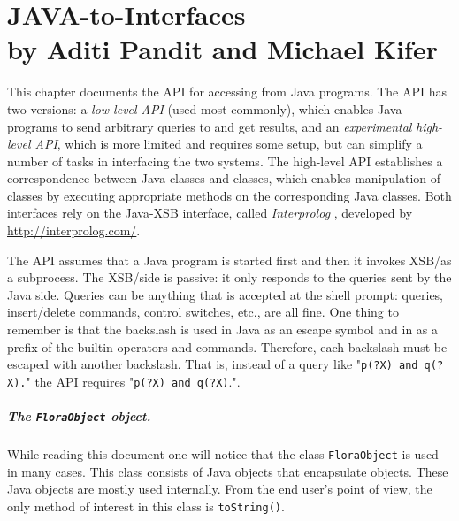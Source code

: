 

\chapter[JAVA-to-\FLSYSTEM Interfaces]
{JAVA-to-\FLSYSTEM Interfaces\\
  {\Large by Aditi Pandit and Michael Kifer}}


This chapter documents the API for accessing \FLSYSTEM from Java
programs.  The API has two versions: a \emph{low-level API} (used most
commonly), which
enables Java programs to send arbitrary queries to \FLSYSTEM and
get results, and an \emph{experimental}
\emph{high-level API}, which is more limited and requires some setup,
but can simplify a number of tasks in interfacing the two systems. The high-level API establishes a
correspondence between Java classes and \FLSYSTEM classes, which
enables manipulation of \FLSYSTEM classes by executing appropriate
methods on the corresponding Java classes. Both interfaces rely on
the Java-XSB interface, called \emph{Interprolog} \cite{Calejo2004}, developed by
\url{http://interprolog.com/}.

The API assumes that a Java program is started first and then it invokes
XSB/\FLSYSTEM as a subprocess. The XSB/\FLSYSTEM side is passive: it only
responds to the queries sent by the Java side.
Queries can be anything that is accepted at the \FLSYSTEM
shell prompt: queries, insert/delete commands, control switches, etc., are
all fine.
One thing to remember is that the backslash is used in Java
as an escape symbol and in \FLSYSTEM as a prefix of the builtin operators
and commands. Therefore, each backslash must be escaped with another
backslash. That is, instead of a query like "\texttt{p(?X) \bs{}and q(?X).}"
the API requires "\texttt{p(?X) \bs{}\bs{}and q(?X)}.".

\paragraph{The \texttt{FloraObject} object.}
While reading this document one will notice that the class
\texttt{FloraObject} is used in many cases. This class consists of
Java objects that
encapsulate  \FLSYSTEM objects. These Java objects
are mostly used internally.
From the end user's point of view, the only method of interest in this
class is
\texttt{toString()}. 


